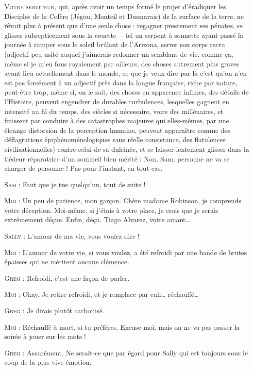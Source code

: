 \begin{dialogue}
\textsc{Votre serviteur}, qui, après avoir un temps formé le projet d’éradiquer les Disciples de la Colère (Jégou, Monteil et Desmarais) de la surface de la terre, ne rêvait plus à présent que d’une seule chose : regagner prestement ses pénates, se glisser subrepticement sous la couette~-- tel un serpent à sonnette ayant passé la journée à ramper sous le soleil brûlant de l’Arizona, serrer son corps recru (adjectif peu usité auquel j’aimerais redonner un semblant de vie, comme ça, même si je m’en fous royalement par ailleurs, des choses autrement plus graves ayant lieu actuellement dans le monde, ce que je veux dire par là c’est qu’on n’en est pas forcément à un adjectif près dans la langue française, riche par nature, peut-être trop, même si, on le sait, des choses en apparence infimes, des détails de l’Histoire, peuvent engendrer de durables turbulences, lesquelles gagnent en intensité au fil du temps, des siècles si nécessaire, voire des millénaires, et finissent par conduire à des catastrophes majeures qui elles-mêmes, par une étrange distorsion de la perception humaine, peuvent apparaître comme des déflagrations épiphénoménologiques sans réelle consistance, des flatulences civilisationnelles) contre celui de sa dulcinée, et se laisser lentement glisser dans la tiédeur réparatrice d’un sommeil bien mérité : Non, Sam, personne ne va se charger de personne ! Pas pour l’instant, en tout cas.

\textsc{Sam} : Faut que je tue quelqu’un, tout de suite !

\textsc{Moi} : Un peu de patience, mon garçon. Chère madame Robinson, je comprends votre déception. Moi-même, si j’étais à votre place, je crois que je serais extrêmement déçue. Enfin, déçu. Tiago Alvarez, votre amant…

\textsc{Sally} : L’amour de ma vie, vous voulez dire !

\textsc{Moi} : L’amour de votre vie, si vous voulez, a été refroidi par une bande de brutes épaisses qui ne méritent aucune clémence.

\textsc{Greg} : Refroidi, c’est une façon de parler.

\textsc{Moi} : Okay. Je retire refroidi, et je remplace par euh… réchauffé…

\textsc{Greg} : Je dirais plutôt carbonisé.

\textsc{Moi} : Réchauffé à mort, si tu préfères. Excuse-moi, mais on ne va pas passer la soirée à jouer sur les mots !

\textsc{Greg} : Assurément. Ne serait-ce que par égard pour Sally qui est toujours sous le coup de la plus vive émotion.


\end{dialogue}
